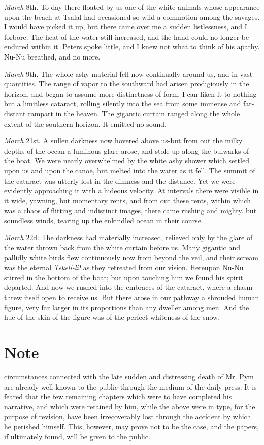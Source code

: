 \emph{March} 8th. To-day there floated by us one of the white animals whose
appearance upon the beach at Tsalal had occasioned so wild a commotion among the
savages. I would have picked it up, but there came over me a sudden
listlessness, and I forbore. The heat of the water still increased, and the hand
could no longer be endured within it. Peters spoke little, and I knew not what
to think of his apathy. Nu-Nu breathed, and no more. 

\emph{March} 9th. The whole ashy material fell now continually around us, and
in vast quantities. The range of vapor to the southward had arisen prodigiously
in the horizon, and began to assume more distinctness of form. I can liken it to
nothing but a limitless cataract, rolling silently into the sea from some
immense and far-distant rampart in the heaven. The gigantic curtain ranged along
the whole extent of the southern horizon. It emitted no sound. 

\emph{March} 21st. A sullen darkness now hovered above us-but from out the
milky depths of the ocean a luminous glare arose, and stole up along the
bulwarks of the boat. We were nearly overwhelmed by the white ashy shower which
settled upon us and upon the canoe, but melted into the water as it fell. The
summit of the cataract was utterly lost in the dimness and the distance. Yet we
were evidently approaching it with a hideous velocity. At intervals there were
visible in it wide, yawning, but momentary rents, and from out these rents,
within which was a chaos of flitting and indistinct images, there came rushing
and mighty. but soundless winds, tearing up the enkindled ocean in their
course. 

\emph{March} 22d. The darkness had materially increased, relieved only by the
glare of the water thrown back from the white curtain before us. Many gigantic
and pallidly white birds flew continuously now from beyond the veil, and their
scream was the eternal \emph{Tekeli-li!} as they retreated from our vision.
Hereupon Nu-Nu stirred in the bottom of the boat; but upon touching him we found
his spirit departed. And now we rushed into the embraces of the cataract, where
a chasm threw itself open to receive us. But there arose in our pathway a
shrouded human figure, very far larger in its proportions than any dweller among
men. And the hue of the skin of the figure was of the perfect whiteness of the
snow. 

\section{Note}
 circumstances connected with the late sudden and distressing death of Mr.
Pym are already well known to the public through the medium of the daily press.
It is feared that the few remaining chapters which were to have completed his
narrative, and which were retained by him, while the above were in type, for the
purpose of revision, have been irrecoverably lost through the accident by which
he perished himself. This, however, may prove not to be the case, and the
papers, if ultimately found, will be given to the public. 

